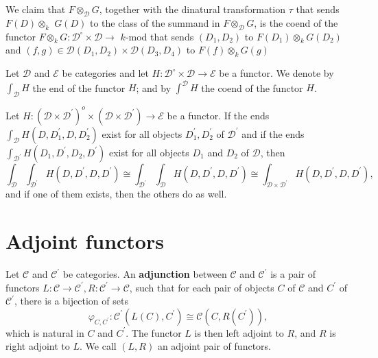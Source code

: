\begin{example}
\begin{enumerate}
        We claim that $F \otimes_{\mathcal{D}} G$, together with the dinatural transformation $\tau$ that sends $F(D) \otimes_k$ $G(D)$ to the class of the summand in $F \otimes_{\mathcal{D}} G$, is the coend of the functor $F \otimes_k G: \mathcal{D}^{\circ} \times \mathcal{D} \rightarrow$ $k$-mod that sends $\left(D_1, D_2\right)$ to $F\left(D_1\right) \otimes_k G\left(D_2\right)$ and $(f, g) \in \mathcal{D}\left(D_1, D_2\right) \times \mathcal{D}\left(D_3, D_4\right)$ to $F(f) \otimes_k G(g)$
\end{enumerate}
\end{example}

Let $\mathcal{D}$ and $\mathcal{E}$ be categories and let $H: \mathcal{D}^{\circ} \times \mathcal{D} \rightarrow \mathcal{E}$ be a functor. We denote by $\int_{\mathcal{D}} H$ the end of the functor $H$; and by $\int^{\mathcal{D}} H$ the coend of the functor $H$.\\

\begin{prop} Let $H:\left(\mathcal{D} \times \mathcal{D}^{\prime}\right)^o \times\left(\mathcal{D} \times \mathcal{D}^{\prime}\right) \rightarrow \mathcal{E}$ be a functor. If the ends $\int_{\mathcal{D}} H\left(D, D_1^{\prime}, D, D_2^{\prime}\right)$ exist for all objects $D_1^{\prime}, D_2^{\prime}$ of $\mathcal{D}^{\prime}$ and if the ends $\int_{\mathcal{D}^{\prime}} H\left(D_1, D^{\prime}, D_2, D^{\prime}\right)$ exist for all objects $D_1$ and $D_2$ of $\mathcal{D}$, then
$$
\int_{\mathcal{D}} \int_{\mathcal{D}^{\prime}} H\left(D, D^{\prime}, D, D^{\prime}\right) \cong \int_{\mathcal{D}^{\prime}} \int_{\mathcal{D}} H\left(D, D^{\prime}, D, D^{\prime}\right) \cong \int_{\mathcal{D} \times \mathcal{D}^{\prime}} H\left(D, D^{\prime}, D, D^{\prime}\right),
$$
and if one of them exists, then the others do as well.
\end{prop} 





\section{Adjoint functors}

Let $\mathcal{C}$ and $\mathcal{C}^{\prime}$ be categories. An \textbf{adjunction} between $\mathcal{C}$ and $\mathcal{C}^{\prime}$ is a pair of functors $L: \mathcal{C} \rightarrow \mathcal{C}^{\prime}, R: \mathcal{C}^{\prime} \rightarrow \mathcal{C}$, such that for each pair of objects $C$ of $\mathcal{C}$ and $C^{\prime}$ of $\mathcal{C}^{\prime}$, there is a bijection of sets
$$
\varphi_{C, C^{\prime}}: \mathcal{C}^{\prime}\left(L(C), C^{\prime}\right) \cong \mathcal{C}\left(C, R\left(C^{\prime}\right)\right),
$$
which is natural in $C$ and $C^{\prime}$.
The functor $L$ is then left adjoint to $R$, and $R$ is right adjoint to $L$. We call $(L, R)$ an adjoint pair of functors.

